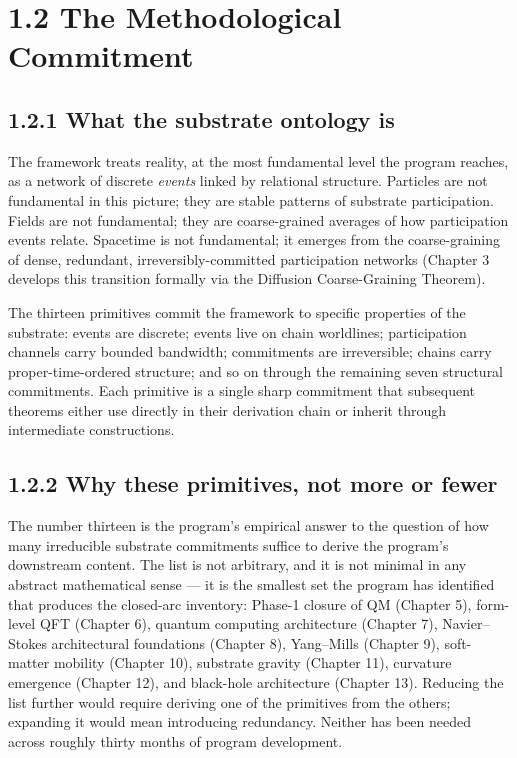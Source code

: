 \documentclass[11pt]{book}
\begin{document}
\section{1.2 The Methodological Commitment}

\subsection{1.2.1 What the substrate ontology is}

The framework treats reality, at the most fundamental level the program reaches, as a network of discrete \textit{events} linked by relational structure. Particles are not fundamental in this picture; they are stable patterns of substrate participation. Fields are not fundamental; they are coarse-grained averages of how participation events relate. Spacetime is not fundamental; it emerges from the coarse-graining of dense, redundant, irreversibly-committed participation networks (Chapter 3 develops this transition formally via the Diffusion Coarse-Graining Theorem).

The thirteen primitives commit the framework to specific properties of the substrate: events are discrete; events live on chain worldlines; participation channels carry bounded bandwidth; commitments are irreversible; chains carry proper-time-ordered structure; and so on through the remaining seven structural commitments. Each primitive is a single sharp commitment that subsequent theorems either use directly in their derivation chain or inherit through intermediate constructions.

\subsection{1.2.2 Why these primitives, not more or fewer}

The number thirteen is the program's empirical answer to the question of how many irreducible substrate commitments suffice to derive the program's downstream content. The list is not arbitrary, and it is not minimal in any abstract mathematical sense — it is the smallest set the program has identified that produces the closed-arc inventory: Phase-1 closure of QM (Chapter 5), form-level QFT (Chapter 6), quantum computing architecture (Chapter 7), Navier–Stokes architectural foundations (Chapter 8), Yang–Mills (Chapter 9), soft-matter mobility (Chapter 10), substrate gravity (Chapter 11), curvature emergence (Chapter 12), and black-hole architecture (Chapter 13). Reducing the list further would require deriving one of the primitives from the others; expanding it would mean introducing redundancy. Neither has been needed across roughly thirty months of program development.
\end{document}
